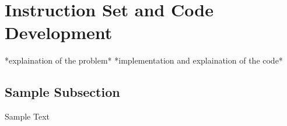 \section{Instruction Set and Code Development} \label{sec:code}
*explaination of the problem*
*implementation and explaination of the code*
\subsection{Sample Subsection}  \label{ssec:laser_technology}
Sample Text \cite{OurWork}